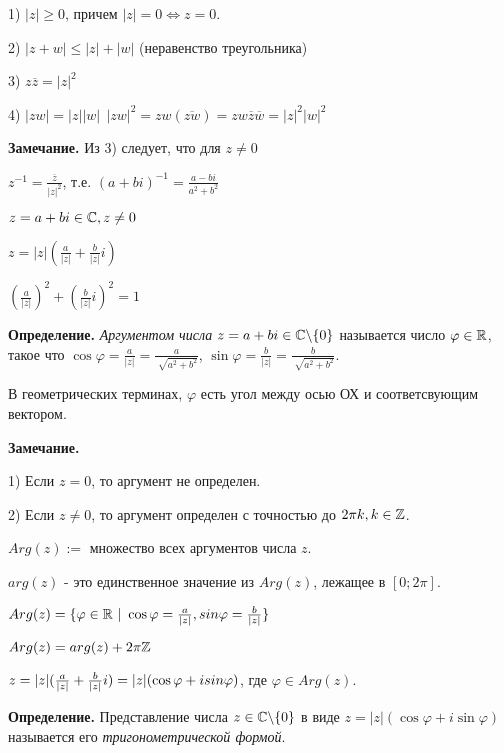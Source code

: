1) $|z| \geq 0$, причем $|z| = 0 \Leftrightarrow z = 0$.

2) $ |z + w| \leq |z| + |w|$ (неравенство треугольника)

3) $z \overline{z} = |z|^2$

4) $|zw| = |z||w| \ \ |zw|^2 = zw(\overline{zw}) = zw \overline{z} \overline{w} =  |z|^2 |w|^2$

\vspace{\baselineskip}
\textbf{Замечание.} Из 3) следует, что для $z \neq 0$

$z^{-1} = \frac{\overline{z}}{|z|^2}$, т.е. $(a + bi)^{-1} = \frac{a-bi}{a^2 + b^2}$

\vspace{\baselineskip}
$z = a + bi \in \mathbb{C}, z \neq 0$

$z = |z| (\frac{a}{|z|} + \frac{b}{|z|}i)$

$(\frac{a}{|z|})^2 + (\frac{b}{|z|}i)^2 = 1$

\vspace{\baselineskip}
\textbf{Определение.} \textit{Аргументом числа} $z = a + bi \in \mathbb{C} \backslash \{0\}$ называется число $\varphi \in \mathbb{R}$, такое что $\cos \varphi = \frac{a}{|z|} = \frac{a} {\sqrt[]{a^2 + b^2}}$, $\sin \varphi = \frac{b}{|z|} = \frac{b}{\sqrt[]{a^2 + b^2}}$.

В геометрических терминах, $\varphi$ есть угол между осью ОХ и соответсвующим вектором.

\vspace{\baselineskip}
\textbf{Замечание.} 

1) Если $z = 0$, то аргумент не определен.

2) Если $z \neq 0$, то аргумент определен с точностью до $2 \pi k, k \in \mathbb{Z}$.

\vspace{\baselineskip}
$Arg(z) :=$ множество всех аргументов числа $z$.

$arg(z)$ - это единственное значение из $Arg(z)$, лежащее в $[0;2 \pi]$.

$Arg(z) = \{ \varphi \in \mathbb{R} \ | \ \cos \varphi = \frac{a}{|z|}, \\sin \varphi = \frac{b}{|z|} \}$

$Arg(z) = arg(z) + 2 \pi \mathbb{Z}$

$z = |z| (\frac{a}{|z|} + \frac{b}{|z|} i) = |z| (\cos \varphi + i \\sin \varphi)$, где $\varphi \in Arg(z)$.

\vspace{\baselineskip}
\textbf{Определение.} Представление числа $z \in \mathbb{C} \backslash \{0 \}$ в виде $z = |z|(\cos \varphi + i \sin \varphi)$ называется его \textit{тригонометрической формой}.

